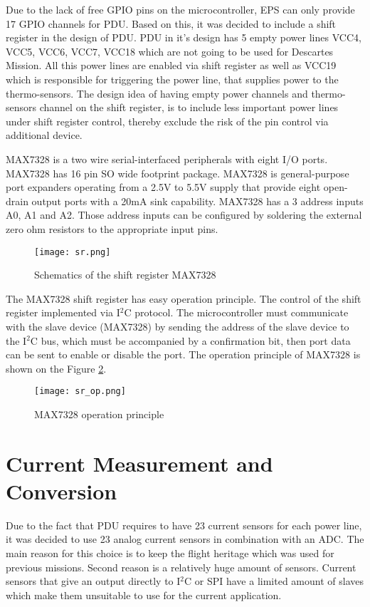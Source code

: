 Due to the lack of free GPIO pins on the microcontroller, EPS can only provide 17 GPIO channels for PDU. Based on this, it was decided to include a shift register in the design of PDU. PDU in it's design has 5 empty power lines VCC4, VCC5, VCC6, VCC7, VCC18 which are not going to be used for Descartes Mission. All this power lines are enabled via shift register as well as VCC19 which is responsible for triggering the power line, that supplies power to the thermo-sensors. The design idea of having empty power channels and thermo-sensors channel on the shift register, is to include less important power lines under shift register control, thereby exclude the risk of the pin control via additional device. 


 MAX7328 is a two wire  serial-interfaced peripherals with eight I/O ports. MAX7328 has 16 pin SO wide footprint package. \cite{29} MAX7328 is general-purpose port expanders operating from a 2.5V to 5.5V supply that provide eight open-drain output ports with a 20mA sink capability.  MAX7328 has a 3 address inputs A0, A1 and A2. Those address inputs can be configured by soldering the external zero ohm resistors to the appropriate input pins.  


\begin{figure}[h]
	\centering
	\texttt{[image: sr.png]}
	\caption{ Schematics of the shift register MAX7328}
	\label{fig: sr1}
\end{figure}

The MAX7328 shift register has easy operation principle. The control of the shift register implemented via I$^2$C protocol. The microcontroller must communicate with the slave device (MAX7328) by sending the address of the slave device to the I$^2$C bus, which must be accompanied by a confirmation bit, then port data can be sent to enable or disable the port. The operation principle of MAX7328 is shown on the Figure \ref{fig: sr_op1}. 
\newpage
\begin{figure}[h]
	\centering
	\texttt{[image: sr\_op.png]}
	\caption{ MAX7328 operation principle}
	\label{fig: sr_op1}
\end{figure}
 
\section{Current Measurement and Conversion}

Due to the fact that PDU requires to have 23 current sensors for each power line, it was decided to use 23 analog current sensors in combination with an ADC. The main reason for this choice is to keep the flight heritage which was used for previous missions. Second reason is a relatively huge amount of sensors. Current sensors that give an output directly to I$^2$C or SPI have a limited amount of slaves which make them unsuitable to use for the current application.\\

